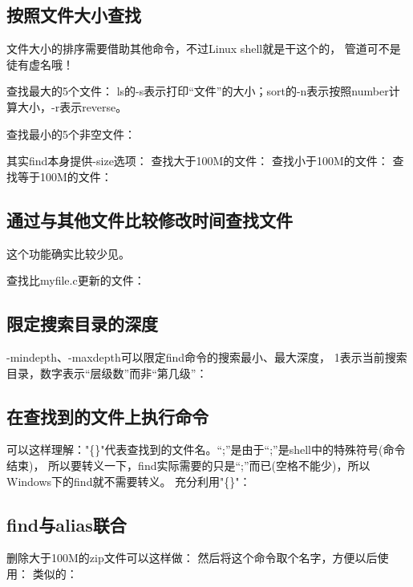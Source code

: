 ﻿\documentclass[a4paper,11pt]{article}
\begin{document}
  \subsection[按照文件大小查找]{按照文件大小查找}
  文件大小的排序需要借助其他命令，不过Linux shell就是干这个的，
  管道可不是徒有虚名哦！

  查找最大的5个文件：
  ls的-s表示打印“文件”的大小；sort的-n表示按照number计算大小，-r表示reverse。

  查找最小的5个非空文件：

  其实find本身提供-size选项：
  查找大于100M的文件：
  查找小于100M的文件：
  查找等于100M的文件：

  \subsection[通过与其他文件比较修改时间查找文件]{通过与其他文件比较修改时间查找文件}
  这个功能确实比较少见。

  查找比myfile.c更新的文件：


  \subsection[限定搜索目录的深度]{限定搜索目录的深度}
  -mindepth、-maxdepth可以限定find命令的搜索最小、最大深度，
  1表示当前搜索目录，数字表示“层级数”而非“第几级”：

  \subsection[在查找到的文件上执行命令]{在查找到的文件上执行命令}
  可以这样理解："\{\}"代表查找到的文件名。“\bs;”是由于“;”是shell中的特殊符号(命令结束)，
  所以要转义一下，find实际需要的只是“\textvisiblespace ;”而已(空格不能少)，所以Windows下的find就不需要转义。
  充分利用"\{\}"：

  \subsection[find与alias联合]{find与alias联合}
  删除大于100M的zip文件可以这样做：
  然后将这个命令取个名字，方便以后使用：
  类似的：
\end{document}
